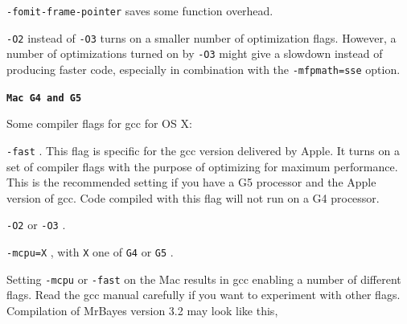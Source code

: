 \documentclass[12pt]{book}
\newcommand{\ttt}[1]{\texttt{#1} }
\newcommand{\tb}[1]{\ttt{\textbf{#1}} }
\begin{document}
\ttt{-fomit-frame-pointer} saves some function overhead. 

\ttt{-O2} instead of \ttt{-O3} turns on a smaller number of optimization flags. However, a number
of optimizations turned on by \ttt{-O3} might give a slowdown instead of producing faster code,
especially in combination with the \ttt{-mfpmath=sse} option. 

\tb{{Mac G4 and G5}}

Some compiler flags for gcc for OS X:

\ttt{-fast}. This flag is specific for the gcc version delivered by Apple.  It turns on a set of
compiler flags with the purpose of optimizing for maximum performance. This is the recommended
setting if you have a G5 processor and the Apple version of gcc. Code compiled with this flag will
not run on a G4 processor.

\ttt{-O2} or \ttt{-O3}.

\ttt{-mcpu=X}, with \ttt{X} one of \ttt{G4} or \ttt{G5}.

Setting \ttt{-mcpu} or \ttt{-fast} on the Mac results in gcc enabling a number of different flags.
Read the gcc manual carefully if you want to experiment with other flags.  Compilation of MrBayes
version 3.2 may look like this,
\end{document}
